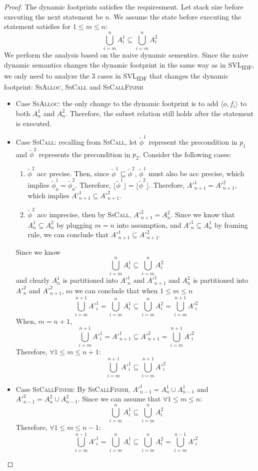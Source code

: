 \documentclass {article}
\newcommand{\tphi}{\widetilde{\phi}}
\begin{document}
\begin{proof}
The dynamic footprints satisfies the requiresment. Let stack size before executing the next statement be $n$. We assume the state before executing the statement satisfies for $1 \leq m \leq n$: $$\bigcup_{i = m}^n A^1_i \subseteq \bigcup_{i=m}^n A^2_i$$
We perform the analysis based on the naive dynamic sementics. Since the naive dynamic semantics changes the dynamic footprint in the same way as in SVL\textsubscript{IDF}, we only need to analyze the 3 cases in SVL\textsubscript{IDF} that changes the dynamic footprint: \textsc{SsAlloc}, \textsc{SsCall} and \textsc{SsCallFinish}
    \begin{itemize}
        \item Case \textsc{SsAlloc}: the only change to the dynamic footprint is to add $\langle o, f_i \rangle$ to both $A^1_n$ and $A^2_n$. Therefore, the subset relation still holds after the statement is executed.
        \item Case \textsc{SsCall}: recalling from \textsc{SsCall}, let $\tphi^1$ represent the precondition in $p_1$ and $\tphi^2$ represents the precondition in $p_2$. Consider the following cases: 
        \begin{enumerate}
            \item $\tphi^2$ acc precise. Then, since $\tphi^1 \sqsubseteq \tphi^2$, $\tphi^1$ must also be acc precise, which implies $\tphi_a^1 = \tphi_a^2$. Therefore, $\lfloor \tphi^1 \rfloor = \lfloor \tphi^2 \rfloor$. Therefore, $A'^1_{n+1} = A'^2_{n+1}$, which implies $A'^1_{n+1} \subseteq A'^2_{n+1}$.
            \item $\tphi^2$ acc imprecise, then by \textsc{SsCall}, $A'^2_{n+1} = A^2_n$. Since we know that $A^1_n \subseteq A^2_n$ by plugging $m = n$ into assumption, and $A'^1_n \subseteq A^1_n$ by framing rule, we can conclude that $A'^1_{n+1} \subseteq A'^2_{n+1}$.
        \end{enumerate}
Since we know $$\bigcup_{i = m}^n A^1_i \subseteq \bigcup_{i=m}^n A^2_i$$ and clearly $A^1_n$ is partitioned into $A'^1_n$ and $A'^1_{n+1}$ and $A^2_n$ is partitioned into $A'^2_n$ and $A'^2_{n+1}$, so we can conclude that when $ 1 \leq m \leq n$
$$\bigcup_{i = m}^{n+1} A'^1_i = \bigcup_{i = m}^n A^1_i \subseteq \bigcup_{i=m}^n A^2_i = \bigcup_{i = m}^{n+1} A'^2_i$$
When, $m = n + 1$, $$\bigcup_{i = m}^{n+1} A'^1_i = A'^1_{n+1} \subseteq A'^2_{n+1} = \bigcup_{i = m}^{n+1} A'^2_i$$ Therefore, $\forall 1 \leq m \leq n+1$:
$$\bigcup_{i = m}^{n+1} A'^1_i  \subseteq \bigcup_{i = m}^{n+1} A'^2_i$$
        \item Case \textsc{SsCallFinish}: By \textsc{SsCallFinish}, $A'^1_{n-1} = A^1_{n} \cup A^1_{n-1}$ and $A'^2_{n-1} = A^2_{n} \cup A^2_{n - 1}$. Since we can assume that $\forall 1 \leq m \leq n$: $$\bigcup_{i = m}^n A^1_i \subseteq \bigcup_{i=m}^n A^2_i$$ Therefore, $\forall 1 \leq m \leq n-1$: $$\bigcup_{i = m}^{n - 1} A'^1_i =\bigcup_{i = m}^{n} A^1_i \subseteq \bigcup_{i = m}^{n} A^2_i  = \bigcup_{i=m}^{n - 1} A'^2_i$$
\end{itemize}
\end{proof}
\end{document}
